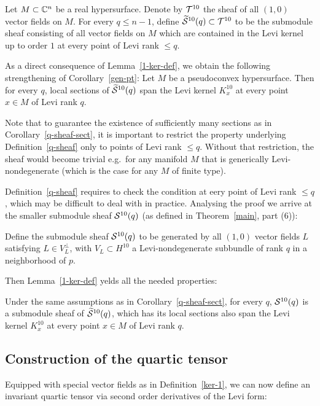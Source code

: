 \documentclass[12pt]{amsart}
\begin{document}
\bd{}
Let $M\subset {\mathbb{C}}^n$ be a real hypersurface.
Denote by ${\mathcal{T}}^{10}$ the sheaf of all 
 $(1,0)$ vector fields on $M$.
For every $q\le n-1$,
define $\widetilde{{\mathcal{S}}}^{10}(q)\subset {\mathcal{T}}^{10}$ to be the submodule sheaf
consisting of all vector fields on $M$ which are
contained in the Levi kernel up to order $1$
 at every point of Levi rank $\le q$.
\ed

As a direct consequence of Lemma~\ref{1-ker-def},
we obtain the following strengthening of Corollary~\ref{gen-pt}:
\bc{}
Let $M$ be a pseudoconvex hypersurface.
Then for every $q$, local sections of $\widetilde{{\mathcal{S}}}^{10}(q)$
span the Levi kernel $K^{10}_x$
at every point $x\in M$ of Levi rank $q$.
\ec

Note that to guarantee the existence of
sufficiently many sections as in 
Corollary~\ref{q-sheaf-sect},
 it is important to restrict
the property underlying Definition~\ref{q-sheaf}
only to points of Levi rank $\le q$.
Without that restriction, 
the sheaf would become trivial
e.g.\ for any
manifold $M$ that is generically 
Levi-nondegenerate
(which is the case for any $M$ of finite type).

Definition~\ref{q-sheaf}
requires to check the condition at eery point of Levi rank $\le q$,
which may be difficult to deal with in practice.
Analysing the proof we arrive at the smaller submodule sheaf
${\mathcal{S}}^{10}(q)$ (as defined in Theorem~\ref{main}, part (6)):

\bd{}
Define the submodule sheaf ${\mathcal{S}}^{10}(q)$
to be generated by all $(1,0)$ vector fields $L$
satisfying $L\in V_L^\perp$,
with $V_L\subset H^{10}$
a Levi-nondegenerate subbundle
of rank $q$ in a neighborhood of $p$.
\ed

Then Lemma~\ref{1-ker-def} yelds all the needed properties:

\bc{}
Under the same assumptions as in Corollary~\ref{q-sheaf-sect},
for every $q$,
${\mathcal{S}}^{10}(q)$ is a submodule sheaf of $\widetilde{{\mathcal{S}}}^{10}(q)$,
which has its local sections also
span the Levi kernel $K^{10}_x$
at every point $x\in M$ of Levi rank $q$.
\ec




\subsection{Construction of the quartic tensor}
Equipped with special vector fields as in Definition~\ref{ker-1},
we can now define an invariant quartic tensor
via second order derivatives of the Levi form:
\end{document}
